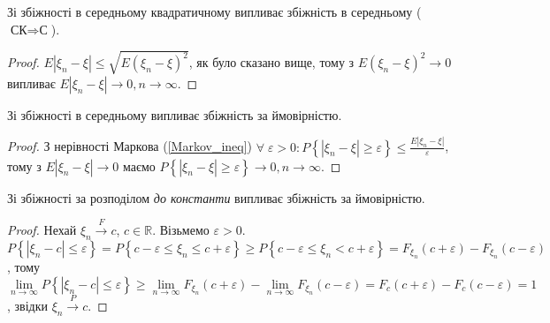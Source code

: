 \begin{proposition*} 
    Зі збіжності в середньому квадратичному випливає збіжність в середньому ($\text{СК} \Rightarrow \text{С}$).
\end{proposition*}
\begin{proof}
    $E|\xi_n -\xi| \leq \sqrt{E(\xi_n - \xi)^2}$, як було сказано вище, тому з $E(\xi_n - \xi)^2 \to 0$
    випливає $E|\xi_n - \xi| \to 0, n\to\infty$.
\end{proof}
\begin{proposition*}
    Зі збіжності в середньому випливає збіжність за ймовірністю.
\end{proposition*}
\begin{proof}
    З нерівності Маркова (\ref{Markov_ineq})
    $\forall \; \varepsilon > 0: P\left\{|\xi_n - \xi| \geq \varepsilon\right\} \leq \frac{E|\xi_n - \xi|}{\varepsilon}$, 
    тому з $E|\xi_n - \xi| \to 0$ маємо $P\left\{|\xi_n - \xi| \geq \varepsilon\right\} \to 0, n\to\infty$.
\end{proof}
\begin{proposition*}
     Зі збіжності за розподілом \emph{до константи} випливає збіжність за ймовірністю.
\end{proposition*}
\begin{proof}
    Нехай $\xi_n \overset{F}{\longrightarrow} c$, $c \in \mathbb{R}$. Візьмемо $\varepsilon > 0$.
    $P\left\{ |\xi_n - c| \leq \varepsilon\right\} = P\left\{ c - \varepsilon \leq \xi_n \leq c + \varepsilon \right\} \geq
    P\left\{ c - \varepsilon \leq \xi_n < c + \varepsilon \right\} = F_{\xi_n}(c+\varepsilon) - F_{\xi_n}(c-\varepsilon)$, тому
    $\underset{n \to \infty}{\lim} P\left\{ |\xi_n - c| \leq \varepsilon\right\} \geq \underset{n \to \infty}{\lim}  F_{\xi_n}(c+\varepsilon) -
    \underset{n \to \infty}{\lim}  F_{\xi_n}(c-\varepsilon) = F_c(c+\varepsilon) - F_c(c-\varepsilon) = 1$, звідки $\xi_n \overset{P}{\longrightarrow} c$.
\end{proof}
